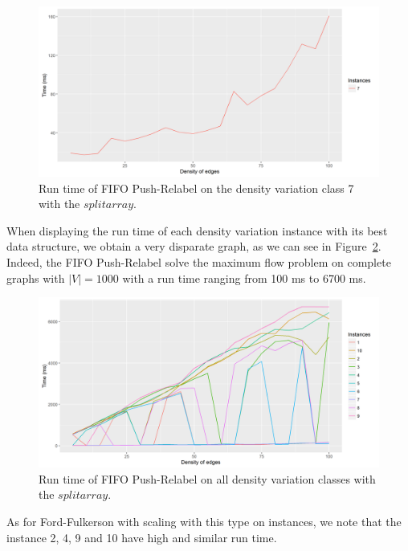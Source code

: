 \begin{figure}[H]
\begin{center}
\includegraphics[scale=0.45]{images/results/pri7.png}
\caption{Run time of FIFO Push-Relabel on the density variation class 7 with the $split array$.}
\label{fig:PR7}
\end{center}
\end{figure}
When displaying the run time of each density variation instance with its best data structure, we obtain a very disparate graph, as we can see in Figure~\ref{fig:PRmean}. Indeed, the FIFO Push-Relabel solve the maximum flow problem on complete graphs with $|V|=1000$ with a run time ranging from 100 ms to 6700 ms.
\begin{figure}[H]
\begin{center}
\includegraphics[scale=0.45]{images/results/PRmean.png}
\caption{Run time of FIFO Push-Relabel on all density variation classes with the $split array$.}
\label{fig:PRmean}
\end{center}
\end{figure}

As for Ford-Fulkerson with scaling with this type on instances, we note that the instance 2, 4, 9 and 10 have high and similar run time.
